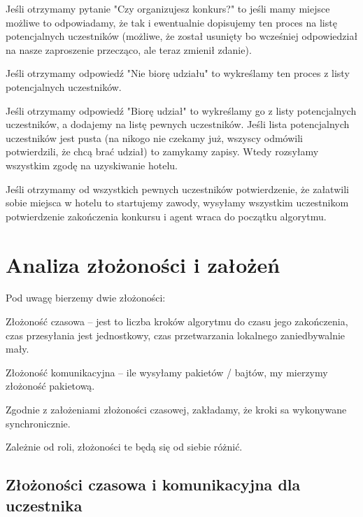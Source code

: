 \documentclass{article}
\begin{document}
\begin{tightlist}
\item Jeśli otrzymamy pytanie "Czy organizujesz konkurs?" to jeśli mamy miejsce możliwe to odpowiadamy, że tak i ewentualnie dopisujemy ten proces na listę potencjalnych uczestników (możliwe, że został usunięty bo wcześniej odpowiedział na nasze zaproszenie przecząco, ale teraz zmienił zdanie). 
\item Jeśli otrzymamy odpowiedź "Nie biorę udziału" to wykreślamy ten proces z listy potencjalnych uczestników.
\item Jeśli otrzymamy odpowiedź "Biorę udział" to wykreślamy go z listy potencjalnych uczestników, a dodajemy na listę pewnych uczestników. Jeśli lista potencjalnych uczestników jest pusta (na nikogo nie czekamy już, wszyscy odmówili potwierdzili, że chcą brać udział) to zamykamy zapisy. Wtedy rozsyłamy wszystkim zgodę na uzyskiwanie hotelu.
\end{tightlist}

Jeśli otrzymamy od wszystkich pewnych uczestników potwierdzenie, że załatwili sobie miejsca w hotelu to startujemy zawody, wysyłamy wszystkim uczestnikom potwierdzenie zakończenia konkursu i agent wraca do początku algorytmu.



\section{Analiza złożoności i założeń}

Pod uwagę bierzemy dwie złożoności:
\begin{tightlist}
\item Złożoność czasowa -- jest to liczba kroków algorytmu do czasu jego zakończenia, czas przesyłania jest jednostkowy, czas przetwarzania lokalnego zaniedbywalnie mały.
\item Złożoność komunikacyjna -- ile wysyłamy pakietów / bajtów, my mierzymy złożoność pakietową.
\end{tightlist}

Zgodnie z założeniami złożoności czasowej, zakładamy, że kroki sa wykonywane synchronicznie.

Zależnie od roli, złożoności te będą się od siebie różnić.

\subsection{Złożoności czasowa i komunikacyjna dla uczestnika}
\end{document}
